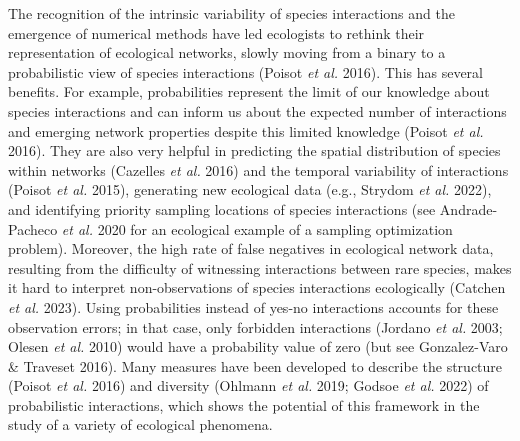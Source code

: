 \documentclass[10pt,oneside]{article}
\begin{document}
The recognition of the intrinsic variability of species interactions and
the emergence of numerical methods have led ecologists to rethink their
representation of ecological networks, slowly moving from a binary to a
probabilistic view of species interactions (Poisot \emph{et al.} 2016).
This has several benefits. For example, probabilities represent the
limit of our knowledge about species interactions and can inform us
about the expected number of interactions and emerging network
properties despite this limited knowledge (Poisot \emph{et al.} 2016).
They are also very helpful in predicting the spatial distribution of
species within networks (Cazelles \emph{et al.} 2016) and the temporal
variability of interactions (Poisot \emph{et al.} 2015), generating new
ecological data (e.g., Strydom \emph{et al.} 2022), and identifying
priority sampling locations of species interactions (see Andrade-Pacheco
\emph{et al.} 2020 for an ecological example of a sampling optimization
problem). Moreover, the high rate of false negatives in ecological
network data, resulting from the difficulty of witnessing interactions
between rare species, makes it hard to interpret non-observations of
species interactions ecologically (Catchen \emph{et al.} 2023). Using
probabilities instead of yes-no interactions accounts for these
observation errors; in that case, only forbidden interactions (Jordano
\emph{et al.} 2003; Olesen \emph{et al.} 2010) would have a probability
value of zero (but see Gonzalez-Varo \& Traveset 2016). Many measures
have been developed to describe the structure (Poisot \emph{et al.}
2016) and diversity (Ohlmann \emph{et al.} 2019; Godsoe \emph{et al.}
2022) of probabilistic interactions, which shows the potential of this
framework in the study of a variety of ecological phenomena.
\end{document}
